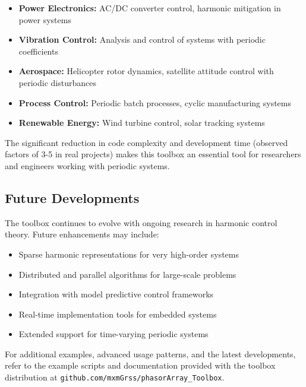 \documentclass[11pt,a4paper]{article}
\begin{document}
\begin{itemize}
    \item \textbf{Power Electronics:} AC/DC converter control, harmonic mitigation in power systems
    \item \textbf{Vibration Control:} Analysis and control of systems with periodic coefficients
    \item \textbf{Aerospace:} Helicopter rotor dynamics, satellite attitude control with periodic disturbances  
    \item \textbf{Process Control:} Periodic batch processes, cyclic manufacturing systems
    \item \textbf{Renewable Energy:} Wind turbine control, solar tracking systems
\end{itemize}

The significant reduction in code complexity and development time (observed factors of 3-5 in real projects) makes this toolbox an essential tool for researchers and engineers working with periodic systems.

\subsection{Future Developments}

The toolbox continues to evolve with ongoing research in harmonic control theory. Future enhancements may include:

\begin{itemize}
    \item Sparse harmonic representations for very high-order systems
    \item Distributed and parallel algorithms for large-scale problems
    \item Integration with model predictive control frameworks
    \item Real-time implementation tools for embedded systems
    \item Extended support for time-varying periodic systems
\end{itemize}

For additional examples, advanced usage patterns, and the latest developments, refer to the example scripts and documentation provided with the toolbox distribution at \texttt{github.com/mxmGrss/phasorArray\_Toolbox}.
\end{document}
